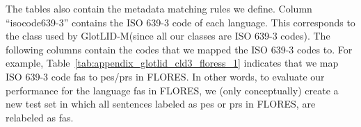 \documentclass[11pt]{article}
\def\modelname{\mbox{GlotLID-M}\xspace}
\def\flores{FLORES\xspace}
\begin{document}
The tables also contain the metadata matching rules we
define. Column ``isocode639-3'' contains the ISO 639-3 code
of each language.
This corresponds to the class used by \modelname (since all
our classes are ISO 639-3 codes).
The following columns contain the codes that we mapped the
ISO 639-3 codes to. For example, Table~\ref{tab:appendix_glotlid_cld3_floress_1} indicates that we
map ISO 639-3 code fas to pes/prs in \flores. In other
words, to evaluate our performance for the language fas
in \flores, we (only conceptually) create a new test set in
which all sentences labeled as pes or prs in \flores, are
relabeled as fas.



\begin{table*}[h]
\small
\centering
{}
\end{table*}
\end{document}
